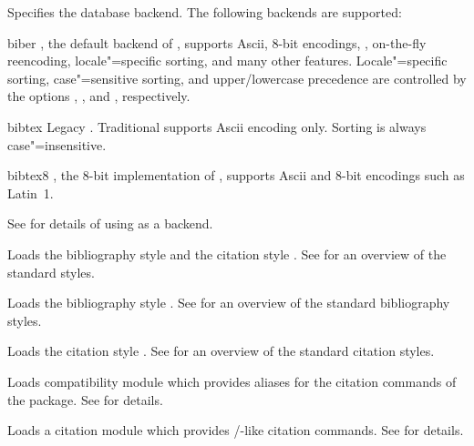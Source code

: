 \documentclass{ltxdockit}[2011/03/25]
\newcommand*{\biber}{\sty{biber}\xspace}
\newcommand*{\biblatex}{\sty{biblatex}\xspace}
\begin{document}
\begin{optionlist}


Specifies the database backend. The following backends are supported:

\begin{valuelist}

\item[biber] \biber, the default backend of \biblatex, supports Ascii, 8-bit encodings, \utf, on-the-fly reencoding, locale"=specific sorting, and many other features. Locale"=specific sorting, case"=sensitive sorting, and upper\slash lowercase precedence are controlled by the options , , and , respectively.

\item[bibtex] Legacy \bibtex. Traditional \bibtex supports Ascii encoding only. Sorting is always case"=insensitive.

\item[bibtex8] , the 8-bit implementation of \bibtex, supports Ascii and 8-bit encodings such as Latin~1.


\end{valuelist}

See  for details of using \bibtex as a backend.


Loads the bibliography style  and the citation style . See  for an overview of the standard styles.


Loads the bibliography style . See  for an overview of the standard bibliography styles.


Loads the citation style . See  for an overview of the standard citation styles.


Loads compatibility module which provides aliases for the citation commands of the  package. See  for details.


Loads a citation module which provides \slash{}-like citation commands. See  for details.

\end{optionlist}
\end{document}
